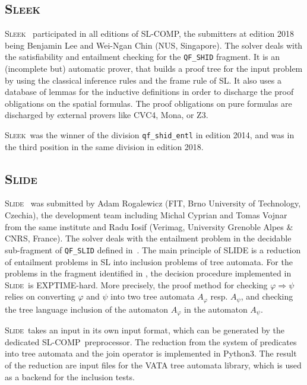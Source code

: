 \documentclass[orivec]{llncs}
\newcommand{\limp}{\Rightarrow}
\newcommand{\SLEEK}{\textsc{Sleek}}
\newcommand{\SLIDE}{\textsc{Slide}}
\newcommand{\slcomp}{\textsf{SL-COMP}}
\begin{document}
\subsection{\SLEEK}

\SLEEK~\cite{ChinDNQ12,SLEEKsite} participated in all editions of \slcomp,
the submitters at edition 2018 being Benjamin Lee and Wei-Ngan Chin (NUS, Singapore).
The solver deals with the satisfiability and entailment checking for the \verb|QF_SHID| fragment.
It is an (incomplete but) automatic prover, that builds a proof tree for the input problem by using the classical inference rules and the frame rule of SL. It also uses a database of lemmas for the inductive definitions in order to discharge the proof obligations on the spatial formulas.
%
The proof obligations on pure formulas are discharged by external provers like CVC4, Mona, or Z3.

\SLEEK\ was the winner of the division \verb|qf_shid_entl| in edition 2014,
and was in the third position in the same division in edition 2018.


\subsection{\SLIDE}

\SLIDE~\cite{IosifRV14,SLIDEsite}  
was submitted by 
Adam Rogalewicz (FIT, Brno University of Technology, Czechia), 
the development team including
Michal Cyprian and Tomas Vojnar from the same institute and
Radu Iosif (Verimag, University Grenoble Alpes \& CNRS, France).
The solver deals with the entailment problem in the decidable sub-fragment of \verb|QF_SLID|  defined in~\cite{IosifRS13}.
The main principle of SLIDE is a reduction of entailment problems in SL into inclusion problems of tree automata. For the problems in the fragment identified in \cite{IosifRS13},
the decision procedure implemented in \SLIDE\ is EXPTIME-hard.
More precisely, the proof method for checking $\varphi\limp\psi$ relies on converting $\varphi$ and $\psi$ into two tree automata $A_\varphi$ resp. $A_\psi$, and checking
the tree language inclusion of the automaton $A_\varphi$ in the automaton $A_\psi$.

\SLIDE\ takes an input in its own input format, which can be generated by the dedicated \slcomp\ preprocessor. The reduction from the system of predicates into tree automata and the join operator is implemented in Python3. The result of the reduction are input files for the VATA tree automata library, which is used as a backend for the inclusion tests.
\end{document}
